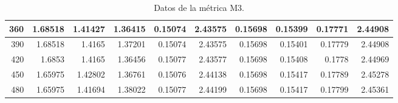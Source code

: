 \begin{table}[h]
\begin{tabular}{|r|r|r|r|r|r|r|r|r|r|}
			\hline \tiny 360 &{\tiny 1.68518}	&{\tiny 1.41427}	&{\tiny 1.36415}	&{\tiny 0.15074}	&{\tiny 2.43575}	&{\tiny 0.15698}	&{\tiny 0.15399}	&{\tiny 0.17771}	&{\tiny 2.44908} \\
			\hline \tiny 390 &{\tiny 1.68518}	&{\tiny 1.4165}	&{\tiny 1.37201}	&{\tiny 0.15074}	&{\tiny 2.43575}	&{\tiny 0.15698}	&{\tiny 0.15401}	&{\tiny 0.17779}	&{\tiny 2.44908} \\
			\hline \tiny 420 &{\tiny 1.6853}	&{\tiny 1.4165}	&{\tiny 1.36456}	&{\tiny 0.15077}	&{\tiny 2.43577}	&{\tiny 0.15698}	&{\tiny 0.15408}	&{\tiny 0.1778}	&{\tiny 2.44969} \\
			\hline \tiny 450 &{\tiny 1.65975}	&{\tiny 1.42802}	&{\tiny 1.36761}	&{\tiny 0.15076}	&{\tiny 2.44138}	&{\tiny 0.15698}	&{\tiny 0.15417}	&{\tiny 0.17789}	&{\tiny 2.45278} \\
			\hline \tiny 480 &{\tiny 1.65975}	&{\tiny 1.41694}	&{\tiny 1.38022}	&{\tiny 0.15077}	&{\tiny 2.44199}	&{\tiny 0.15698}	&{\tiny 0.15417}	&{\tiny 0.17799}	&{\tiny 2.45361} \\						
			\hline								
		\end{tabular}
		\caption{Datos de la m\'etrica M3.}		
   \label{tabA3}	
\end{table}

